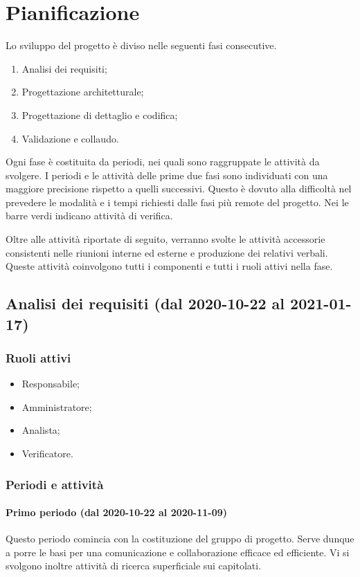 \section{Pianificazione}
Lo sviluppo del progetto è diviso nelle seguenti fasi consecutive.
\begin{enumerate}
	\item Analisi dei requisiti;
	\item Progettazione architetturale;
	\item Progettazione di dettaglio e codifica;
	\item Validazione e collaudo.
\end{enumerate}
Ogni fase è costituita da periodi, nei quali sono raggruppate le attività da svolgere.
I periodi e le attività delle prime due fasi sono individuati con una maggiore precisione rispetto a quelli successivi. Questo è dovuto alla difficoltà nel prevedere le modalità e i tempi richiesti dalle fasi più remote del progetto.
Nei  le barre verdi indicano attività di verifica.

Oltre alle attività riportate di seguito, verranno svolte le attività accessorie consistenti nelle riunioni interne ed esterne e produzione dei relativi verbali. Queste attività coinvolgono tutti i componenti e tutti i ruoli attivi nella fase. 

\subsection{Analisi dei requisiti (dal 2020-10-22 al 2021-01-17)}

\subsubsection{Ruoli attivi}
\begin{itemize}
	\item Responsabile;
	\item Amministratore;
	\item Analista;
	\item Verificatore.
\end{itemize}

\subsubsection{Periodi e attività}

\paragraph{Primo periodo (dal 2020-10-22 al 2020-11-09)}
Questo periodo comincia con la costituzione del gruppo di progetto. Serve dunque a porre le basi per una comunicazione e collaborazione efficace ed efficiente. Vi si svolgono inoltre attività di ricerca superficiale sui capitolati.

